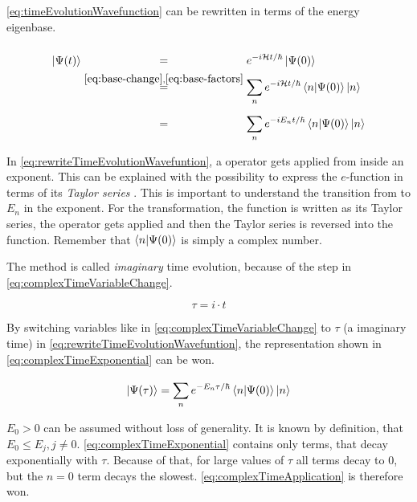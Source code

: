 \autoref{eq:timeEvolutionWavefunction} can be rewritten in terms of the energy eigenbase.

\begin{equation}
    \label{eq:rewriteTimeEvolutionWavefuntion}
    \begin{split}
        \ket{\Psi(t)} &\stackrel{\phantom{\ref{eq:base-change}, \ref{eq:base-factors}}}{=} e^{-i\hamiltonian t / \hbar} \ket{\Psi(0)} \\
        &\stackrel{\ref{eq:base-change}, \ref{eq:base-factors}}{=}
        \sum\limits_{n}^{} e^{-i \hamiltonian t / \hbar} \bra{n}\ket{\Psi(0)} \ket{n}\\
        &\stackrel{\phantom{\ref{eq:base-change}, \ref{eq:base-factors}}}{=}
        \sum\limits_{n}^{} e^{-i E_n t / \hbar} \bra{n}\ket{\Psi(0)} \ket{n}
    \end{split}
\end{equation}

In \autoref{eq:rewriteTimeEvolutionWavefuntion}, a operator gets applied from inside an exponent. This can be explained with the possibility to express the $e$-function in terms of its \emph{Taylor series} \cite{schwablQM}. This is important to understand the transition from \hamiltonian to $E_n$ in the exponent. For the transformation, the function is written as its Taylor series, the operator gets applied and then the Taylor series is reversed into the function. Remember that $\bra{n}\ket{\Psi(0)}$ is simply a complex number.

The method is called \emph{imaginary} time evolution, because of the step in \autoref{eq:complexTimeVariableChange}.

\begin{equation}
    \label{eq:complexTimeVariableChange}
    \tau = i\cdot t
\end{equation}

By switching variables like in \autoref{eq:complexTimeVariableChange} to $\tau$ (a \glqq imaginary\grqq{} time) in \autoref{eq:rewriteTimeEvolutionWavefuntion}, the representation shown in \autoref{eq:complexTimeExponential} can be won.

\begin{equation}
    \label{eq:complexTimeExponential}
    \ket{\Psi(\tau)} = \sum\limits_{n}^{} e^{-E_n \tau / \hbar} \bra{n}\ket{\Psi(0)} \ket{n}
\end{equation}

$E_0 > 0$ can be assumed without loss of generality.
It is known by definition, that $E_0 \leq E_j, j\neq 0$. 
\autoref{eq:complexTimeExponential} contains only terms, that decay exponentially with $\tau$.
Because of that, for large values of $\tau$ all terms decay to 0, but the $n=0$ term decays the slowest. \autoref{eq:complexTimeApplication} is therefore won.

